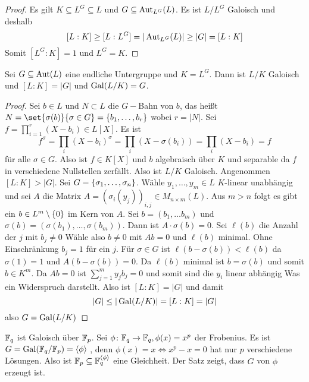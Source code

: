 \begin{proof}
    Es gilt $K\subseteq L^G\subseteq L$ und $G\subseteq\operatorname{Aut}_{L^G}(L)$. Es ist $L/L^G$ Galoisch und deshalb
    $$[L:K]\geq [L:L^G]=|\operatorname{Aut}_{L^G}(L)|\geq |G|=[L:K]$$
    Somit $[L^G:K]=1$ und $L^G=K$.
\end{proof}
\begin{Satz}\label{Satz:Galois2}
    Sei $G\subseteq \operatorname{Aut}(L)$ eine endliche Untergruppe und $K=L^G$. Dann ist $L/K$ Galoisch und $[L:K]=|G|$ und $\operatorname{Gal}(L/K)=G$.
\end{Satz}
\begin{proof}
    Sei $b\in L$ und $N\subset L$ die $G-$Bahn von $b$, das heißt $N=\set{\sigma(b)}{ \sigma\in G}=\{b_1,\dots,b_r\}$ wobei $r=|N|$. Sei $f=\prod_{i=1}^r(X-b_i)\in L[X]$.
    Es ist $$f^\sigma=\prod_i(X-b_i)^\sigma=\prod_i(X-\sigma(b_i))=\prod_i(X-b_i)=f$$ für alle $\sigma\in G.$ Also ist $f\in K[X]$ und $b$ algebraisch über $K$ und separable da $f$ in verschiedene Nullstellen zerfällt.
    Also ist $L/K$ Galoisch.
    Angenommen $[L:K]>|G|$. Sei $G=\{\sigma_1,\dots,\sigma_n\}$. Wähle $y_1,\dots,y_m\in L$ $K$-linear unabhängig und sei $A$ die Matrix $A=(\sigma_i(y_j))_{i,j}\in M_{n\times m}(L)$.
    Aus $m>n$ folgt es gibt ein $b\in L^m\setminus\{0\}$ im Kern von $A$.
    Sei $b=(b_1,\dots b_m)$ und $\sigma(b)=(\sigma(b_1),\dots,\sigma(b_m))$.
    Dann ist $A\cdot \sigma(b)=0$.
    Sei $\ell(b)$ die Anzahl der $j$ mit $b_j\neq 0$ Wähle also $b\neq 0$ mit $Ab=0$ und $\ell(b)$ minimal. Ohne Einschränkung $b_j=1$ für ein $j$.
    Für $\sigma\in G$ ist $\ell(b-\sigma(b))<\ell(b)$ da $\sigma(1)=1$ und $A(b-\sigma(b))=0$. Da $\ell(b)$ minimal ist $b=\sigma(b)$ und somit $b\in K^m$.
    Da $Ab=0$ ist $\sum_{j=1}^my_jb_j=0$ und somit sind die $y_i$ linear abhängig Was ein Widerspruch darstellt.
    Also ist $[L:K]=|G|$ und damit 
    $$|G|\leq |\operatorname{Gal}(L/K)|=[L:K]=|G|$$ also $G=\operatorname{Gal}(L/K)$
\end{proof}
\begin{Bsp}
    $\mathbb{F}_q$ ist Galoisch über $\mathbb{F}_p$. Sei $\phi\colon \mathbb{F}_q\to \mathbb{F}_q, \phi(x)=x^p$ der Frobenius. Es ist $G=\operatorname{Gal}(\mathbb{F}_q/\mathbb{F}_p)=\langle\phi\rangle$
, denn $\phi(x)=x\iff x^p-x=0$ hat nur $p$ verschiedene Lösungen. Also ist $\mathbb{F}_p\subseteq \mathbb{F}_q^{\langle\phi\rangle}$ eine Gleichheit. Der Satz zeigt, dass $G$ von $\phi$ erzeugt ist.
\end{Bsp}
